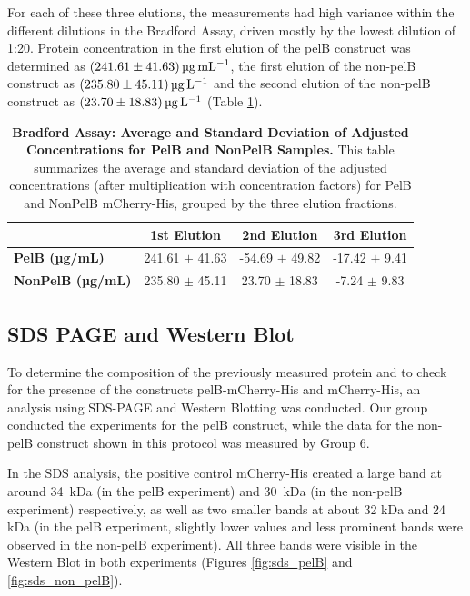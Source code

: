 \documentclass[a4paper,12pt]{article}
\begin{document}
For each of these three elutions, the measurements had high variance within the different dilutions in the Bradford Assay, driven mostly by the lowest dilution of 1:20. Protein concentration in the first elution of the pelB construct was determined as $\SI{241.61\pm 41.63}{\micro\gram\per\milli\liter}$, the first elution of the non-pelB construct as $\SI{235.80\pm 45.11}{\micro\gram\per\liter}$ and the second elution of the non-pelB construct as $\SI{23.70 \pm 18.83}{\micro\gram\per\liter}$ (Table \ref{tab:bradford3}).

\begin{table}[h!]
    \centering
    \caption{\textbf{Bradford Assay: Average and Standard Deviation of Adjusted Concentrations for PelB and NonPelB Samples.} This table summarizes the average and standard deviation of the adjusted concentrations (after multiplication with concentration factors) for PelB and NonPelB mCherry-His, grouped by the three elution fractions.}
    \begin{tabular}{lccc}
        & \textbf{1st Elution} & \textbf{2nd Elution} & \textbf{3rd Elution}\\
        \hline
        \textbf{PelB (µg/mL)} & 241.61 $\pm$ 41.63 & -54.69 $\pm$ 49.82 & -17.42 $\pm$ 9.41 \\
        \textbf{NonPelB (µg/mL)} & 235.80 $\pm$ 45.11 & 23.70 $\pm$ 18.83 & -7.24 $\pm$ 9.83  \\
        \hline
    \end{tabular}
    \label{tab:bradford3}
\end{table}

\subsection{SDS PAGE and Western Blot}
To determine the composition of the previously measured protein and to check for the presence of the constructs pelB-mCherry-His and mCherry-His, an analysis using SDS-PAGE and Western Blotting was conducted. Our group conducted the experiments for the pelB construct, while the data for the non-pelB construct shown in this protocol was measured by Group 6.

In the SDS analysis, the positive control mCherry-His created a large band at around 34~kDa (in the pelB experiment) and 30~kDa (in the non-pelB experiment) respectively, as well as two smaller bands at about 32 kDa and 24 kDa (in the pelB experiment, slightly lower values and less prominent bands were observed in the non-pelB experiment). All three bands were visible in the Western Blot in both experiments (Figures \ref{fig:sds_pelB} and \ref{fig:sds_non_pelB}). 
\end{document}
